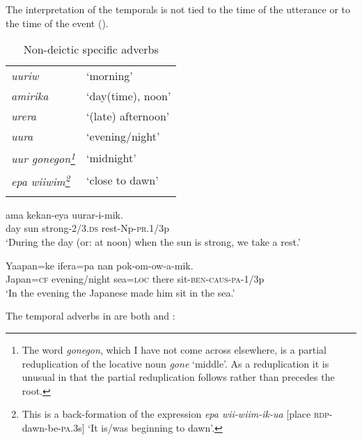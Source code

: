 The interpretation of the  temporals is not tied to the time of the utterance or to the time of the event (). 

\begin{table}
\begin{tabular}{>{\itshape}ll}
\mytoprule
uuriw &`morning'\\
amirika &`day(time), noon'\\
urera &`(late) afternoon'\\
uura &`evening/night'\\
uur gonegon\footnote{The word \textit{gonegon}, which I have not come across elsewhere, is a partial reduplication of the locative noun \textit{gone} `middle'. As a reduplication it is unusual in that the partial reduplication follows rather than precedes the root.} &`midnight'\\
epa wiiwim\footnote{This is a back-formation of the expression \textit{epa wii-wiim-ik-ua} [place \textsc{rdp}-dawn-be-\textsc{pa}.3s] `It is/was beginning to dawn'.} &`close to dawn'\\
\mybottomrule 
\end{tabular}
\caption{Non-deictic specific adverbs}
\label{tab:3:nondeicticspecific}
\end{table}

\ea%
\label{ex:3:x698}
\gll {} ama kekan-eya uurar-i-mik. \\
day sun strong-2/3.\textsc{ds} rest-Np-\textsc{pr}.1/3p\\
\glt`During the day (or: at noon) when the sun is strong, we take a rest.'
\z

\ea%
\label{ex:3:x699}
\gll Yaapan=ke  ifera=pa nan pok-om-ow-a-mik. \\
Japan=\textsc{cf} evening/night sea=\textsc{loc} there sit-\textsc{ben}-\textsc{caus}-\textsc{pa}-1/3p\\
\glt`In the evening the Japanese made him sit in the sea.'
\z

The temporal adverbs in  are both  and :

